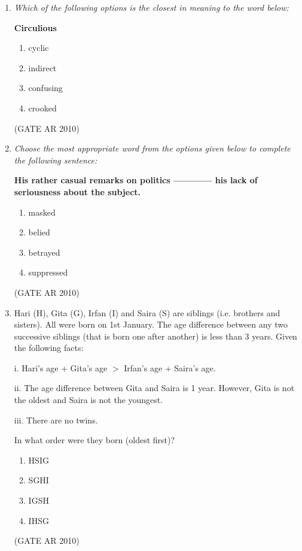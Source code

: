 \documentclass[journal]{IEEEtran}
\begin{document}
\begin{enumerate}
\item \textit{Which of the following options is the closest in meaning to the word below:}

\textbf{Circulious}

\begin{enumerate}
\item cyclic
\item indirect
\item confusing
\item crooked
\end{enumerate}
\hfill (GATE AR 2010)

\item \textit{Choose the most appropriate word from the options given below to complete the following sentence:}

\textbf{His rather casual remarks on politics ------------ his lack of seriousness about the subject.}

\begin{enumerate}
\item masked
\item belied
\item betrayed
\item suppressed
\end{enumerate}
\hfill (GATE AR 2010)

\item Hari (H), Gita (G), Irfan (I) and Saira (S) are siblings (i.e. brothers and sisters). All were born on 1st January. The age difference between any two successive siblings (that is born one after another) is less than 3 years. Given the following facts:


i.  Hari's age + Gita's age $>$ Irfan's age + Saira's age.

ii.  The age difference between Gita and Saira is 1 year. However, Gita is not the oldest and Saira is not the youngest.

iii.  There are no twins.

In what order were they born (oldest first)?

\begin{multicols}{4}
\begin{enumerate}
\item HSIG
\item SGHI
\item IGSH
\item IHSG
\end{enumerate}
\end{multicols}
\hfill (GATE AR 2010)


\end{enumerate}
\end{document}
